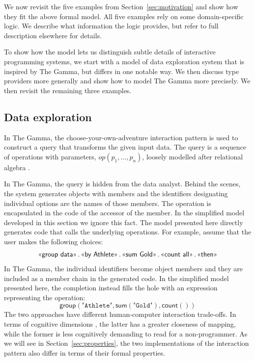 \documentclass[ a4paper,UKenglish,cleveref, autoref, thm-restate]{lipics-v2021}
\newcommand{\ident}[1]{\textsf{#1}}
\newcommand{\ddident}[1]{\guillemotleft\ident{#1}\guillemotright}
\newcommand{\op}{\textit{op}}
\begin{document}
We now revisit the five examples from Section~\ref{sec:motivation} and show how they fit the
above formal model. All five examples rely on some domain-specific logic. We describe what
information the logic provides, but refer to full description elsewhere for details.

To show how the model lets us distinguish subtle details of interactive programming systems,
we start with a model of data exploration system that is inspired by The Gamma, but differs in
one notable way. We then discuss type providers more generally and show how to model The Gamma
more precisely. We then revisit the remaining three examples.


\subsection{Data exploration}
\label{sec:examples-data}

In The Gamma, the choose-your-own-adventure interaction pattern is used to construct a
query that transforms the given input data. The query is a sequence of operations with parameters,
$\op(p_1, \ldots, p_n)$, loosely modelled after relational algebra \cite{codd-1970-relational}.

In The Gamma, the query is hidden from the data analyst. Behind the scenes, the system generates
objects with members and the identifiers designating individual options are the names of those
members. The operation is encapsulated in the code of the accessor of the member. In the
simplified model developed in this section we ignore this fact. The model presented here directly
generates code that calls the underlying operations. For example, assume that the user makes
the following choices:
\[
\textnormal{\ddident{group data}\,.\,\ddident{by Athlete}\,.\,\ddident{sum Gold}\,.\,\ddident{count all}\,.\,\ddident{then}}
\]
In The Gamma, the individual identifiers become object members and they are included as
a member chain in the generated code. In the simplified model presented here, the completion
instead fills the hole with an expression representing the operation:
\[
\ident{group}(\texttt{"Athlete"}, \ident{sum}(\texttt{"Gold"}), \ident{count}())
\]
The two approaches have different human-computer interaction trade-offs. In terms of cognitive
dimensions \cite{green-1989-cogdims,blackwell-2003-cogdims}, the latter has a greater closeness
of mapping, while the former is less cognitively demanding to read for a non-programmer.
As we will see in Section~\ref{sec:properties}, the two implementations of the
interaction pattern also differ in terms of their formal properties.
\end{document}

